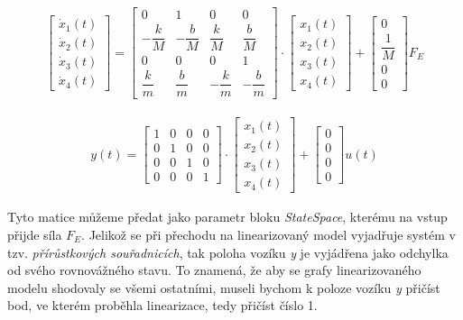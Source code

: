 \begin{align*}
    \begin{bmatrix} \dot{x}_1(t)\\ \dot{x}_2(t)\\ \dot{x}_3(t)\\ \dot{x}_4(t) \end{bmatrix} =
    \begin{bmatrix} 0 & 1 & 0 & 0\\ - \dfrac{k}{M} & - \dfrac{b}{M} & \dfrac{k}{M} & \dfrac{b}{M}\\ 0 & 0 & 0 & 1\\ \dfrac{k}{m} & \dfrac{b}{m} & - \dfrac{k}{m} & - \dfrac{b}{m}\end{bmatrix} \cdot 
    \begin{bmatrix} x_1(t)\\ x_2(t)\\ x_3(t)\\ x_4(t) \end{bmatrix} +
    \begin{bmatrix} 0\\ \dfrac{1}{M}\\ 0\\ 0 \end{bmatrix} F_E
\end{align*}

\begin{align*}
    y(t) =
    \begin{bmatrix} 1 & 0 & 0 & 0\\ 0 & 1 & 0 & 0\\ 0 & 0 & 1 & 0\\ 0 & 0 & 0 & 1 \end{bmatrix} \cdot 
    \begin{bmatrix} x_1(t)\\ x_2(t)\\ x_3(t)\\ x_4(t) \end{bmatrix} + 
    \begin{bmatrix} 0\\ 0\\ 0\\ 0 \end{bmatrix} u(t)
\end{align*}

Tyto matice můžeme předat jako parametr bloku \textit{StateSpace}, kterému na vstup přijde síla \( F_E \). Jelikož se při přechodu na linearizovaný model vyjadřuje systém v tzv. \textit{přírůstkových souřadnicích}, tak poloha vozíku \textit{y} je vyjádřena jako odchylka od svého rovnovážného stavu. To znamená, že aby se grafy linearizovaného modelu shodovaly se všemi ostatními, museli bychom k poloze vozíku \textit{y} přičíst bod, ve kterém proběhla linearizace, tedy přičíst číslo 1.

